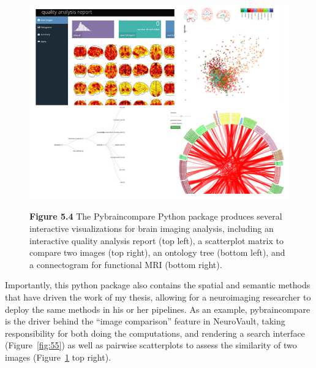 \documentclass{report}
\begin{document}
\begin{figure}[h!]
\begin{center}
\includegraphics[width=15cm]{images/figure54.png}
\end{center}
 \textbf{\label{fig:54} Figure 5.4 }{ The Pybraincompare Python package produces several interactive visualizations for brain imaging analysis, including an interactive quality analysis report (top left), a scatterplot matrix to compare two images (top right), an ontology tree (bottom left), and a connectogram for functional MRI (bottom right).}
\end{figure}

Importantly, this python package also contains the spatial and semantic
methods that have driven the work of my thesis, allowing for a
neuroimaging researcher to deploy the same methods in his or her
pipelines. As an example, pybraincompare is the driver behind the
``image comparison'' feature in NeuroVault, taking responsibility for
both doing the computations, and rendering a search interface (Figure~\ref{fig:55}) as well as pairwise scatterplots to assess the similarity of two
images (Figure~\ref{fig:54} top right).
\end{document}
